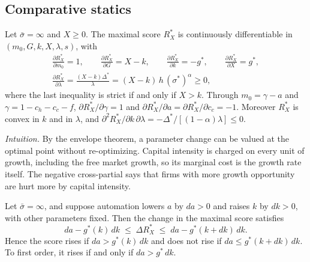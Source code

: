\subsection{Comparative statics}\label{sec:model-statics}

\begin{lemma}\label{prop:envelope}\label{prop:capital}
Let $\bar\sigma=\infty$ and $X\ge 0$. The maximal score $R_X^*$ is continuously differentiable in $(m_0,G,k,X,\lambda,s)$, with
\begin{equation}\label{eq:envelope}
\begin{gathered}
\frac{\partial R_X^*}{\partial m_0}=1,\qquad
\frac{\partial R_X^*}{\partial G}=X-k,\qquad
\frac{\partial R_X^*}{\partial k}=-g^*,\qquad
\frac{\partial R_X^*}{\partial X}=g^*,\\
\frac{\partial R_X^*}{\partial\lambda}=\frac{(X-k)\Delta^*}{\lambda}=(X-k)\,h\,(\sigma^*)^{\alpha}\ge 0,
\end{gathered}
\end{equation}
where the last inequality is strict if and only if $X>k$. Through $m_0=\gamma-a$ and $\gamma=1-c_h-c_c-f$, $\partial R_X^*/\partial\gamma=1$ and $\partial R_X^*/\partial a=\partial R_X^*/\partial c_c=-1$. Moreover $R_X^*$ is convex in $k$ and in $\lambda$, and $\partial^2R_X^*/\partial k\,\partial\lambda=-\Delta^*/[(1-\alpha)\lambda]\le 0$.
\end{lemma}

\noindent\emph{Intuition.} By the envelope theorem, a parameter change can be valued at the optimal point without re-optimizing. Capital intensity is charged on every unit of growth, including the free market growth, so its marginal cost is the growth rate itself. The negative cross-partial says that firms with more growth opportunity are hurt more by capital intensity.

\begin{corollary}\label{cor:capital}\label{cor:substitution}
Let $\bar\sigma=\infty$, and suppose automation lowers $a$ by $da>0$ and raises $k$ by $dk>0$, with other parameters fixed. Then the change in the maximal score satisfies
\begin{equation}\label{eq:kl-bracket}
da-g^*(k)\,dk\;\le\;\Delta R_X^*\;\le\;da-g^*(k+dk)\,dk .
\end{equation}
Hence the score rises if $da>g^*(k)\,dk$ and does not rise if $da\le g^*(k+dk)\,dk$. To first order, it rises if and only if $da>g^*\,dk$.
\end{corollary}

